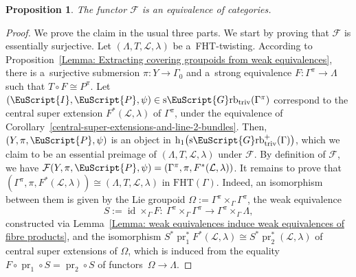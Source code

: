\documentclass[10pt,a4paper]{amsart}
\numberwithin{equation}{section}
\newtheorem{Proposition}[Theorem]{Proposition}
 { \theoremstyle{definition}
\newtheorem{Definition}[Theorem]{Definition}
\newtheorem{Example}[Theorem]{Example}
\newtheorem{Remark}[Theorem]{Remark} }
\def\mathscr#1{\EuScript{#1}}
\def\hc#1{\mathrm{h}_{#1}}
\newcommand{\pr}{\operatorname{pr}}
\newcommand{\id}{\operatorname{id}}
\newcommand{\Grbtriv}{\mathscr{G}\mathrm{rb}_{\mathrm{triv}}}
\newcommand{\sGrbtriv}{\mathrm{s}\Grbtriv}
\begin{document}
\begin{Proposition}
\label{The FHT functor: essential surjectivity}
\label{The FHT functor: fullness}
\label{The FHT functor: faithfulness}
The functor $\mathcal{F}$ is an equivalence of categories.
\end{Proposition}
\begin{proof}
We prove the claim in the usual three parts. We start by proving that $\mathcal{F}$ is essentially surjective.
 Let $(\Lambda, T,\mathcal{L},\lambda)$ be a~FHT-twisting. According to Proposition~\ref{Lemma: Extracting covering groupoids from weak equivalences}, there is a~surjective submersion $\pi\colon Y \to \Gamma_0$ and a~strong equivalence $F \colon \Gamma^{\pi} \to \Lambda $ such that $T \circ F \cong P^{\pi}$.
 Let $(\mathscr{I},\mathscr{P},\psi)\in \sGrbtriv(\Gamma^{\pi})$ correspond to the central super extension $F^{*}(\mathcal{L},\lambda)$ of $\Gamma^{\pi}$, under the equivalence of Corollary~\ref{central-super-extensions-and-line-2-bundles}.
 Then, $(Y,\pi,\mathscr{P},\psi)$ is an object in $\hc 1\bigl(\sGrbtriv^{+}(\Gamma)\bigr)$, which we claim to be an essential preimage of $(\Lambda, T,\mathcal{L},\lambda)$ under $\mathcal{F}$.
 By definition of $\mathcal{F}$, we have $\mathcal{F}(Y,\pi,\mathscr{P},\psi)=(\Gamma^{\pi},\pi,F^*(\mathcal{L},\lambda))$. It remains to prove that
 $(\Gamma^{\pi},\pi,F^*(\mathcal{L},\lambda)) \cong (\Lambda, T,\mathcal{L},\lambda)$ in $\mathrm{FHT}(\Gamma)$. Indeed, an isomorphism between them is given by the Lie groupoid $\Omega := \Gamma^\pi \times_\Gamma \Gamma^{\pi}$,
 the weak equivalence
 \begin{equation*}
 S:= \id \times_{\Gamma} F \colon \ \Gamma^\pi \times_\Gamma \Gamma^{\pi} \to \Gamma^\pi \times_\Gamma \Lambda,
 \end{equation*}
 constructed via Lemma~\ref{Lemma: weak equivalences induce weak equivalences of fibre products},
 and the isomorphism
$
 S^*\pr_{1}^* F^*(\mathcal{L},\lambda) \cong S^*\pr_{2}^* (\mathcal{L},\lambda)
$
 of central super extensions of $\Omega$, which is induced from the equality
$F \circ \pr_1 \circ S = \pr_2 \circ S$ of functors~${\Omega \to \Lambda}$.


\end{proof}
\end{document}
